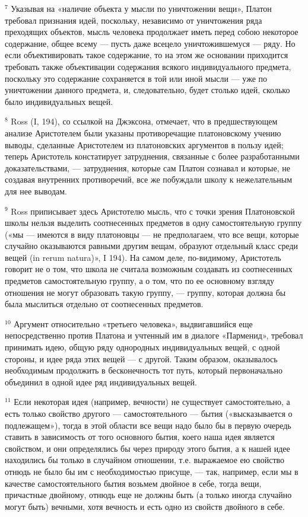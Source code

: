 \documentclass[oneside, 17pt, dvipsnames]{extbook}
\begin{document}
$^7$ Указывая на «наличие объекта у мысли по уничтожении вещи», Платон требовал признания идей, поскольку, независимо от уничтожения ряда преходящих объектов, мысль человека продолжает иметь перед собою некоторое содержание, общее всему — пусть даже всецело уничтожившемуся — ряду. Но если объективировать такое содержание, то на этом же основании приходится требовать также объективации содержания всякого индивидуального предмета, поскольку это содержание сохраняется в той или иной мысли — уже по уничтожении данного предмета, и, следовательно, будет столько идей, сколько было индивидуальных вещей.

$^8$ Ross (I, 194), со ссылкой на Джэксона, отмечает, что в предшествующем анализе Аристотелем были указаны противоречащие платоновскому учению выводы, сделанные Аристотелем из платоновских аргументов в пользу идей; теперь Аристотель констатирует затруднения, связанные с более разработанными доказательствами, — затруднения, которые сам Платон сознавал и которые, не создавая внутренних противоречий, все же побуждали школу к нежелательным для нее выводам.

$^9$ Ross приписывает здесь Аристотелю мысль, что с точки зрения Платоновской школы нельзя выделить соотнесенных предметов в одну самостоятельную группу («мы — имеются в виду платоновцы — не предполагаем, что все вещи, которые случайно оказываются равными другим вещам, образуют отдельный класс среди вещей (in rerum natura)», I 194). На самом деле, по-видимому, Аристотель говорит не о том, что школа не считала возможным создавать из соотнесенных предметов самостоятельную группу, а о том, что по ее основному взгляду отношения не могут образовать такую группу, — группу, которая должна бы была мыслиться отдельно от соотнесенных предметов.

$^{10}$ Аргумент относительно «третьего человека», выдвигавшийся еще непосредственно против Платона и учтенный им в диалоге «Парменид», требовал принимать идею, общую ряду однородных индивидуальных вещей, с одной стороны, и идее ряда этих вещей — с другой. Таким образом, оказывалось необходимым продолжить в бесконечность тот путь, который первоначально объединил в одной идее ряд индивидуальных вещей.

$^{11}$ Если некоторая идея (например, вечности) не существует самостоятельно, а есть только свойство другого — самостоятельного — бытия («высказывается о подлежащем»), тогда в этой области все вещи надо было бы в первую очередь ставить в зависимость от того основного бытия, коего наша идея является свойством, и они определялись бы через природу этого бытия, а к нашей идее находились бы только в случайном отношении, т.е. выражаемое ею свойство отнюдь не было бы им с необходимостью присуще, — так, например, если мы в качестве самостоятельного бытия возьмем двойное в себе, тогда вещи, причастные двойному, отнюдь еще не должны быть (а только иногда случайно могут быть) вечными, хотя вечность и есть одно из свойств двойного в себе.
\end{document}

